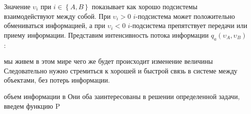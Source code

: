 Значение $\upsilon_i$ при $i \in \left\{A,B \right\}$ показывает как хорошо подсистемы взаимодействуют между собой. При $\upsilon_i > 0$ $i$-подсистема может положительно обмениваться информацией, а при $\upsilon_i < 0$ $i$-подсистема препятствует передачи или приему информации.  Представим интенсивность потока информации $q_a(\upsilon_A,\upsilon_B)$:

мы живем в этом мире 
 чего же будет происходит изменение величины 
Следовательно нужно стремиться к хорошей и быстрой связь в системе между объектами, без потерь информации.

 объем информации в Они оба заинтересованы в решении определенной задачи, введем функцию P   

 


\pagebreak